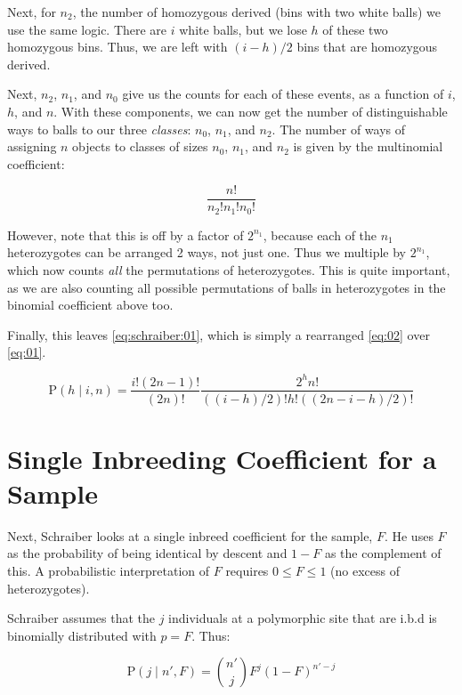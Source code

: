 \documentclass[12pt]{article}\usepackage[]{graphicx}\usepackage[]{color}
\begin{document}
Next, for $n_2$, the number of homozygous derived (bins with two white
balls) we use the same logic. There are $i$ white balls, but we lose
$h$ of these two homozygous bins. Thus, we are left with $(i - h)/2$
bins that are homozygous derived.

Next, $n_2$, $n_1$, and $n_0$ give us the counts for each of these
events, as a function of $i$, $h$, and $n$. With these components, we
can now get the number of distinguishable ways to balls to our three
\emph{classes}: $n_0$, $n_1$, and $n_2$. The number of ways of
assigning $n$ objects to classes of sizes $n_0$, $n_1$, and $n_2$ is
given by the multinomial coefficient:

\begin{equation} \label{eq:03}
\frac{n!}{n_2! n_1! n_0!}
\end{equation}

However, note that this is off by a factor of $2^{n_1}$, because each
of the $n_1$ heterozygotes can be arranged 2 ways, not just one. Thus
we multiple by $2^{n_1}$, which now counts \emph{all} the permutations
of heterozygotes. This is quite important, as we are also counting all
possible permutations of balls in heterozygotes in the binomial
coefficient above too.

Finally, this leaves \autoref{eq:schraiber:01}, which is simply a
rearranged \autoref{eq:02} over \autoref{eq:01}.

\begin{equation} \label{eq:schraiber:01}
  \text{P}(h \mid i, n) = \frac{i!(2n-1)!}{(2n)!}\frac{2^h n!}{((i-h)/2)!h!((2n - i - h)/2)!}
\end{equation}

\section{Single Inbreeding Coefficient for a Sample}

Next, Schraiber looks at a single inbreed coefficient for the sample,
$F$. He uses $F$ as the probability of being identical by descent and
$1-F$ as the complement of this. A probabilistic interpretation of $F$
requires $0 \le F \le 1$ (no excess of heterozygotes).

Schraiber assumes that the $j$ individuals at a polymorphic site that
are i.b.d is binomially distributed with $p = F$. Thus:

\begin{equation} \label{eq:schraiber:02}
\text{P}(j \mid n', F) = {n' \choose j} F^j (1-F)^{n' - j}
\end{equation}
\end{document}

